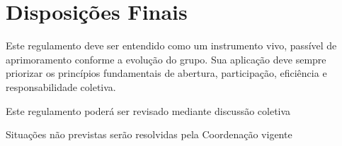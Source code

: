 \documentclass[
  12pt,          %
  a4paper,       %
  oneside,       %
  brazil         %
]{article}
\begin{document}
\section{Disposições Finais}

Este regulamento deve ser entendido como um instrumento vivo, passível de aprimoramento conforme a evolução do grupo. 
Sua aplicação deve sempre priorizar os princípios fundamentais de abertura, participação, eficiência e responsabilidade coletiva.

\begin{conduta}
	\item Este regulamento poderá ser revisado mediante discussão coletiva
	\item Situações não previstas serão resolvidas pela Coordenação vigente
\end{conduta}

\vspace{2cm}

\end{document}
